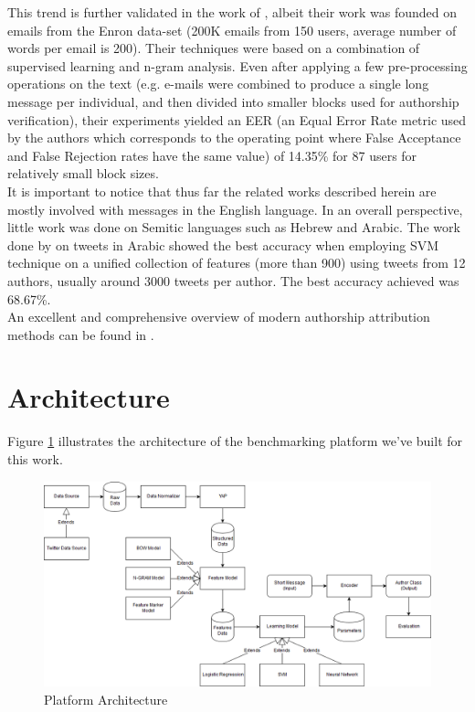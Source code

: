 \documentclass[a4paper]{article}
\begin{document}
This trend is further validated in the work of \citep{brocardo}, albeit their work was founded on emails from the Enron data-set (200K emails from 150 users, average number of words per email is 200). Their techniques were based on a combination of supervised learning and n-gram analysis. Even after applying a few pre-processing operations on the text (e.g. e-mails were combined to produce a single long message per individual, and then divided into smaller blocks used for authorship verification), their experiments yielded an EER (an Equal Error Rate metric used by the authors which corresponds to the operating point where False Acceptance and False Rejection rates have the same value) of 14.35\% for 87 users for relatively small block sizes.\\
It is important to notice that thus far the related works described herein are mostly involved with messages in the English language. In an overall perspective, little work was done on Semitic languages such as Hebrew and Arabic. The work done by \citep{rabab} on tweets in Arabic showed the best accuracy when employing SVM technique on a unified collection of features (more than 900) using tweets from 12 authors, usually around 3000 tweets per author. The best accuracy achieved was 68.67\%.\\
An excellent and comprehensive overview of modern authorship attribution methods can be found in \citep{stamatatos}.

\section{Architecture}
\label{Architecture}

Figure \ref{fig:architecture} illustrates the architecture of the benchmarking platform we've built for this work.\\
\begin{figure}[hb]
	\centering
	\includegraphics[width=.5\textwidth]{"architecture/NLP Author Classification Architecture"}
	\caption{Platform Architecture}
		\label{fig:architecture}
\end{figure}\\
\end{document}
